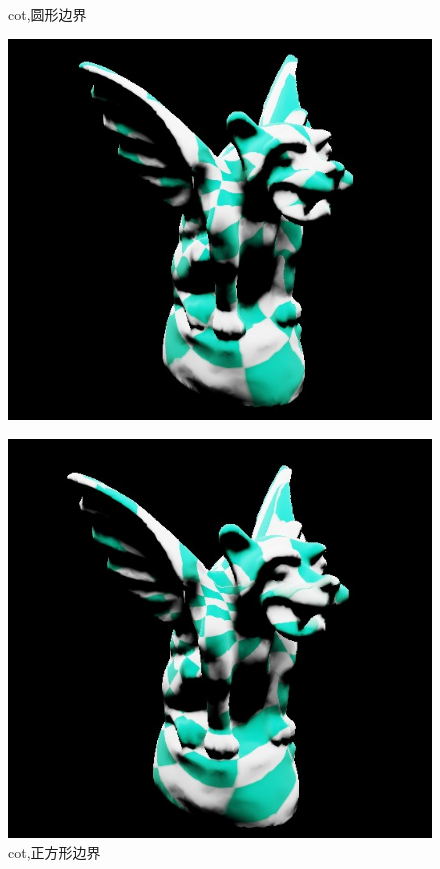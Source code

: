 \documentclass{article}
\begin{document}
	\begin{figure}[htbp]
		\centering
		\begin{minipage}{0.24\linewidth}
			\centering
			\caption{cot,圆形边界}
			\includegraphics[width=1\linewidth]{gargoyle_circle_tex.JPG}
			\label{chutian1}%
		\end{minipage}
		\begin{minipage}{0.24\linewidth}
			\centering
			\caption{cot,正方形边界}
			\includegraphics[width=1\linewidth]{gargoyle_square_tex.JPG}

\end{minipage}
\end{figure}
\end{document}
